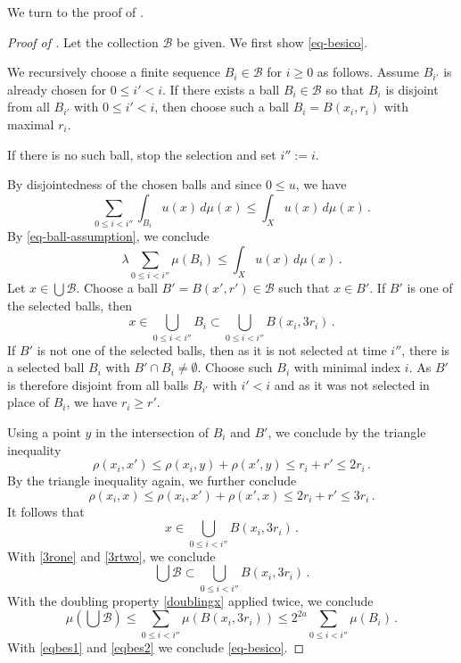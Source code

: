 We turn to the proof of .
\begin{proof}[Proof of ]
Let the collection $\mathcal{B}$ be given.
We first show \eqref{eq-besico}.

We recursively choose a finite sequence $B_i\in \mathcal{B}$
for $i\ge 0$ as follows. Assume $B_{i'}$
is already chosen for $0\le i'<i$.
If there exists a ball $B_{i}\in \mathcal{B}$ so that $B_{i}$
is disjoint from all $B_{i'}$
with $0\le i'<i$, then choose
such a ball $B_i=B(x_i,r_i)$ with maximal $r_i$.

If there is no such ball, stop the selection and set
$i'':=i$.

By disjointedness of the chosen balls and since $0 \le u$, we have
\begin{equation}
\sum_{0\le i<i''}\int_{B_i} u(x)\, d\mu(x) \le \int_X u(x)\, d\mu(x)\, .
\end{equation}
By \eqref{eq-ball-assumption}, we conclude
\begin{equation}\label{eqbes1}
\lambda \sum_{0\le i<i''}\mu(B_i)
\le \int_X u(x)\, d\mu(x)\, .
\end{equation}
Let $x\in \bigcup \mathcal{B}$.
Choose a ball $B'=B(x',r')\in \mathcal{B}$
such that $x\in B'$.
If $B'$ is one of the selected balls, then
\begin{equation}\label{3rone}
    x\in \bigcup _{0\le i< i''}B_i\subset \bigcup _{0\le i< i''}B(x_i,3r_i)\, .
\end{equation}
If $B'$ is not one of the selected balls, then as it is not selected at time $i''$, there is a selected ball $B_i$ with
$B'\cap B_i\neq \emptyset$.
Choose such $B_i$ with minimal index $i$. As $B'$ is therefore disjoint from all
balls $B_{i'}$ with $i'<i$ and
as it was not selected in place of $B_i$, we have $r_i\ge r'$.

Using a point $y$ in the intersection of $B_i$ and $B'$,
we conclude by the triangle inequality
\begin{equation}
   \rho(x_i,x')\le \rho(x_i,y)+\rho(x',y)\le r_i+r'\le 2r_i \, .
\end{equation}
By the triangle inequality again, we further conclude
\begin{equation}
   \rho(x_i,x)\le \rho(x_i,x')+\rho(x',x)\le 2r_i+r'\le 3r_i \, .
\end{equation}
It follows that
\begin{equation}\label{3rtwo}
    x\in \bigcup _{0\le i< i''}B(x_i,3r_i)\, .
\end{equation}
With \eqref{3rone} and \eqref{3rtwo}, we conclude
\begin{equation}
\bigcup \mathcal{B}\subset
\bigcup _{0\le i< i''}B(x_i,3r_i)\, .
\end{equation}
With the doubling property
\eqref{doublingx} applied twice, we conclude
\begin{equation}\label{eqbes2}
    \mu(\bigcup{\mathcal{B}})
    \le \sum _{0\le i< i''}\mu (B(x_i,3r_i))
    \le 2^{2a}\sum _{0\le i< i''}\mu (B_i)\, .
\end{equation}
With \eqref{eqbes1} and \eqref{eqbes2} we conclude
\eqref{eq-besico}.



\end{proof}
